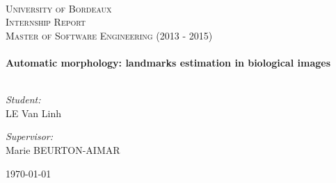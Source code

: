 \begin{titlepage}
\begin{center}
\\[2cm]
\textsc{\LARGE University of Bordeaux} \\[1.5cm]
\textsc{\Large Internship Report}\\[1cm]
\textsc{\Large Master of Software Engineering (2013 - 2015)}\\[1cm]
\HRule
\\[0.3cm]
\huge \bfseries Automatic morphology: landmarks estimation in biological images
\\[0.3cm]
\HRule
\\[2cm]
\noindent 
\begin{minipage}{0.4\textwidth}
\begin{flushleft} \large
\emph{Student:}\\
\textsc{LE} Van Linh 
\end{flushleft}
\end{minipage}%
\begin{minipage}{0.6\textwidth}
\begin{flushright} \large
\emph{Supervisor:} \\
Marie \textsc{BEURTON-AIMAR} \\
\end{flushright}
\end{minipage}

\vfill
{\large \today}
\end{center}
\end{titlepage}
